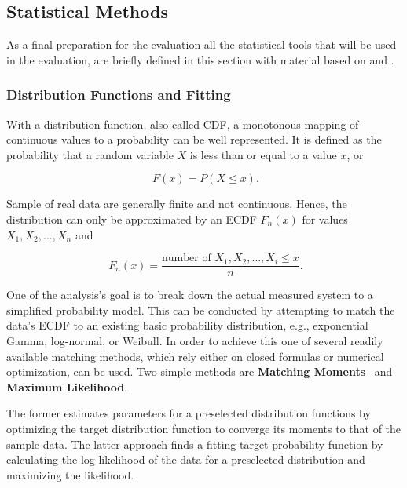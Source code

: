 \subsection{Statistical Methods}

As a final preparation for the evaluation all the statistical tools that will be used in the evaluation, are briefly defined in this section with material based on \cite{field2012discovering} and \cite{Knuth:1997:ACP:270146}.


\subsubsection{Distribution Functions and Fitting}

With a distribution function, also called \gls{CDF}, a monotonous mapping of continuous values to a probability can be well represented. It is defined as the probability that a random variable $X$ is less than or equal to a value $x$, or

\begin{equation}
	\phantom{.} F(x) = P(X\leq x)\text{.}
\end{equation}

Sample of real data are generally finite and not continuous. Hence, the distribution can only be approximated by an \gls{ECDF} $F_n(x)$ for values $X_1, X_2, \ldots , X_n$ and

\begin{equation}
	\phantom{.}F_n(x) = \frac{\text{number of }X_1, X_2, \ldots , X_i \leq x}{n}\text{.}
\end{equation}

One of the analysis's goal is to break down the actual measured system to a simplified probability model. This can be conducted by attempting to match the data's \gls{ECDF} to an existing basic probability distribution, e.g., exponential Gamma, log-normal, or Weibull. In order to achieve this one of several readily available matching methods, which rely either on closed formulas or numerical optimization, can be used. Two simple methods are \textbf{Matching Moments}~\cite[pp.~99-143]{vose2000risk} and \textbf{Maximum Likelihood}.

The former estimates parameters for a preselected distribution functions by optimizing the target distribution function to converge its moments to that of the sample data. The latter approach finds a fitting target probability function by calculating the log-likelihood of the data for a preselected distribution and maximizing the likelihood.

